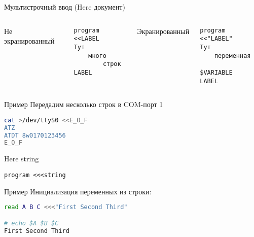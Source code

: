 \begin{frame}[fragile]{Мультистрочный ввод (Here документ)}

	\begin{columns}
	{\center Не экранированный}
\begin{verbatim}
program <<LABEL
Тут
    много
        строк
LABEL
\end{verbatim}
	{\center Экранированный}
\begin{verbatim}
program <<"LABEL"
Тут
    переменная
        $VARIABLE
LABEL
\end{verbatim}
	\end{columns}
	\pause
	\begin{block}{Пример}
	Передадим несколько строк в COM-порт 1
\begin{lstlisting}[language=bash]
cat >/dev/ttyS0 <<E_O_F
ATZ
ATDT 8w0170123456
E_O_F
\end{lstlisting}
	\end{block}
\end{frame}

\begin{frame}[fragile]{Here string}

\begin{verbatim}
program <<<string
\end{verbatim}

	\begin{block}{Пример}
	Инициализация переменных из строки:
\begin{lstlisting}[language=bash]
read A B C <<<"First Second Third"

# echo $A $B $C
First Second Third
\end{lstlisting}
	\end{block}
\end{frame}
